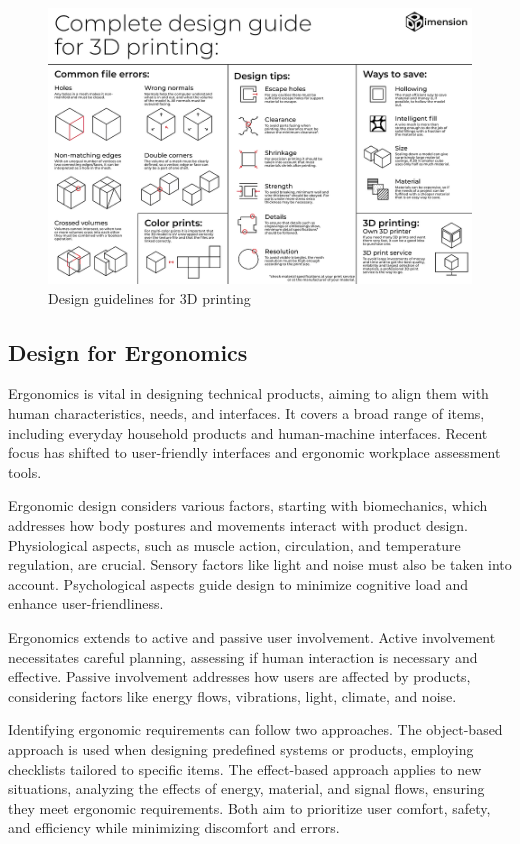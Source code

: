 \begin{figure}
    \centering
    \includegraphics[width=0.92\linewidth]{texs/Part1/chapter4/image/guidelines.png}
    \caption{Design guidelines for 3D printing \cite{DDDimension_22}}
    \label{fig:guideline}
\end{figure}

\subsection{Design for Ergonomics}
Ergonomics \cite{Pahl07ab} is vital in designing technical products, aiming to align them with human characteristics, needs, and interfaces. It covers a broad range of items, including everyday household products and human-machine interfaces. Recent focus has shifted to user-friendly interfaces and ergonomic workplace assessment tools.

Ergonomic design considers various factors, starting with biomechanics, which addresses how body postures and movements interact with product design. Physiological aspects, such as muscle action, circulation, and temperature regulation, are crucial. Sensory factors like light and noise must also be taken into account. Psychological aspects guide design to minimize cognitive load and enhance user-friendliness.

Ergonomics extends to active and passive user involvement. Active involvement necessitates careful planning, assessing if human interaction is necessary and effective. Passive involvement addresses how users are affected by products, considering factors like energy flows, vibrations, light, climate, and noise.

Identifying ergonomic requirements can follow two approaches. The object-based approach is used when designing predefined systems or products, employing checklists tailored to specific items. The effect-based approach applies to new situations, analyzing the effects of energy, material, and signal flows, ensuring they meet ergonomic requirements. Both aim to prioritize user comfort, safety, and efficiency while minimizing discomfort and errors.

